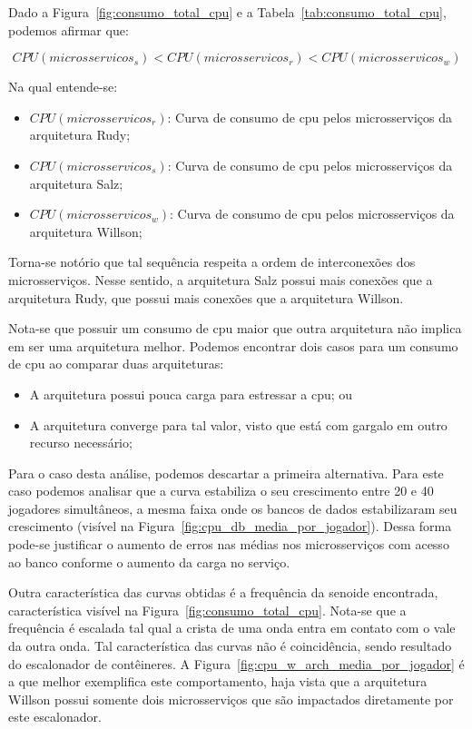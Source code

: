 Dado a Figura~\ref{fig:consumo_total_cpu} e a Tabela~\ref{tab:consumo_total_cpu}, podemos afirmar que:

$$
    CPU(microsservicos_{s}) < CPU(microsservicos_{r}) < CPU(microsservicos_{w})
$$

Na qual entende-se:

\begin{itemize}
\item $CPU(microsservicos_{r})$: Curva de consumo de \ac{cpu} pelos microsserviços da arquitetura Rudy;
\item $CPU(microsservicos_{s})$: Curva de consumo de \ac{cpu} pelos microsserviços da arquitetura Salz;
\item $CPU(microsservicos_{w})$: Curva de consumo de \ac{cpu} pelos microsserviços da arquitetura Willson;
\end{itemize}

Torna-se notório que tal sequência respeita a ordem de interconexões dos microsserviços.
%
Nesse sentido, a arquitetura Salz possui mais conexões que a arquitetura Rudy, que possui mais conexões que a arquitetura Willson.

Nota-se que possuir um consumo de \ac{cpu} maior que outra arquitetura não implica em ser uma arquitetura melhor.
%
Podemos encontrar dois casos para um consumo de \ac{cpu} ao comparar duas arquiteturas:

\begin{itemize}
 \item A arquitetura possui pouca carga para estressar a \ac{cpu}; ou
 \item A arquitetura converge para tal valor, visto que está com gargalo em outro recurso necessário;
\end{itemize}

Para o caso desta análise, podemos descartar a primeira alternativa.
%
Para este caso podemos analisar que a curva estabiliza o seu crescimento entre 20 e 40 jogadores simultâneos, a mesma faixa onde os bancos de dados estabilizaram seu crescimento (visível na Figura~\ref{fig:cpu_db_media_por_jogador}).
%
Dessa forma pode-se justificar o aumento de erros nas médias nos microsserviços com acesso ao banco conforme o aumento da carga no serviço.

Outra característica das curvas obtidas é a frequência da senoide encontrada, característica visível na Figura~\ref{fig:consumo_total_cpu}.
%
Nota-se que a frequência é escalada tal qual a crista de uma onda entra em contato com o vale da outra onda.
%
Tal característica das curvas não é coincidência, sendo resultado do escalonador de contêineres.
%
A Figura~\ref{fig:cpu_w_arch_media_por_jogador} é a que melhor exemplifica este comportamento, haja vista que a arquitetura Willson possui somente dois microsserviços que são impactados diretamente por este escalonador.



